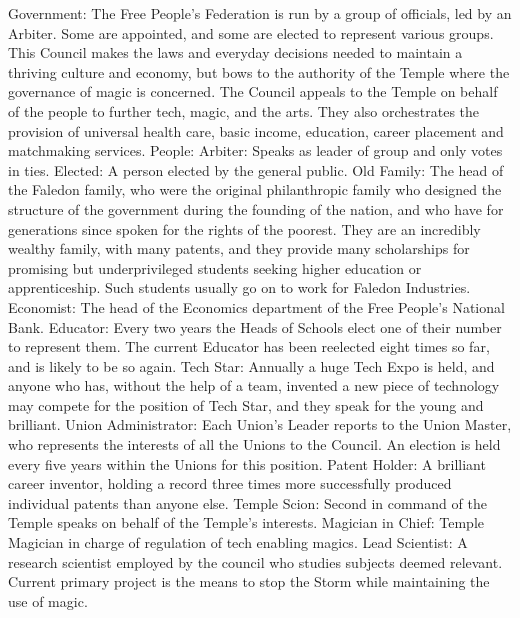 \documentclass[blue]{GL2020}
\begin{document}
Government:  The Free People's Federation is run by a group of officials, led by an Arbiter. Some are appointed, and some are elected to represent various groups.  This Council makes the laws and everyday decisions needed to maintain a thriving culture and economy, but bows to the authority of the Temple where the governance of magic is concerned.  The Council appeals to the Temple on behalf of the people to further tech, magic, and the arts.  They also orchestrates the provision of universal health care, basic income, education, career placement and matchmaking services.
	People:		Arbiter:	Speaks as leader of group and only votes in ties.
						Elected:	A person elected by the general public. 
						Old Family:	The head of the Faledon family, who were the original philanthropic family who designed the structure of the government during the founding of the nation, and who have for generations since spoken for the rights of the poorest.  They are an incredibly wealthy family, with many patents, and they provide many scholarships for promising but underprivileged students seeking higher education or apprenticeship.  Such students usually go on to work for Faledon Industries.
						Economist:	The head of the Economics department of the Free People's National Bank.
						Educator:		Every two years the Heads of Schools elect one of their number to represent them.  The current Educator has been reelected eight times so far, and is likely to be so again.
						Tech Star:	Annually a huge Tech Expo is held, and anyone who has, without the help of a team, invented a new piece of technology may compete for the position of Tech Star, and they speak for the young and brilliant.
						Union Administrator:	Each Union's Leader reports to the Union Master, who represents the interests of all the Unions to the Council.  An election is held every five years within the Unions for this position.
						Patent Holder:	A brilliant career inventor, holding a record three times more successfully produced individual patents than anyone else.
						Temple Scion:  Second in command of the Temple speaks on behalf of the Temple's interests.
						Magician in Chief:  Temple Magician in charge of regulation of tech enabling magics.
						Lead Scientist:  A research scientist employed by the council who studies subjects deemed relevant.  Current primary project is the means to stop the Storm while maintaining the use of magic.
	
\end{document}
